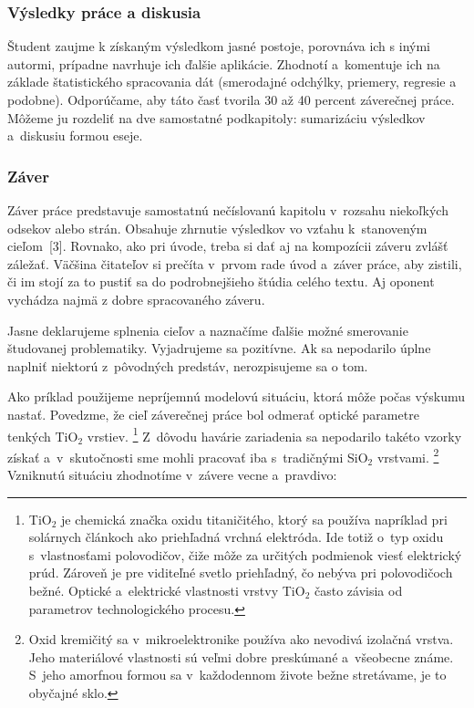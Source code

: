\subsubsection*{\normalsize Výsledky práce a diskusia}
Študent zaujme k získaným výsledkom jasné postoje,
porovnáva ich s inými autormi, prípadne navrhuje ich ďalšie aplikácie.
Zhodnotí a~komentuje ich na základe štatistického spracovania dát (smerodajné odchýlky, priemery, regresie a podobne).
Odporúčame, aby táto časť tvorila 30 až 40 percent záverečnej práce.
Môžeme ju rozdeliť na dve samostatné podkapitoly: sumarizáciu výsledkov a~diskusiu formou eseje.

\subsubsection{Záver}
Záver práce predstavuje samostatnú nečíslovanú kapitolu
v~rozsahu niekoľkých odsekov alebo strán.
Obsahuje zhrnutie výsledkov vo vzťahu k~stanoveným cieľom~[3].
Rovnako, ako pri úvode, treba si dať
aj na kompozícii záveru zvlášť záležať.
Väčšina čitateľov si prečíta v~prvom rade úvod a~záver práce,
aby zistili, či im stojí za to pustiť sa do podrobnejšieho
štúdia celého textu.
Aj oponent vychádza najmä z dobre spracovaného záveru.

Jasne deklarujeme splnenia cieľov a naznačíme ďalšie možné smerovanie študovanej problematiky. Vyjadrujeme sa pozitívne. Ak sa nepodarilo úplne naplniť niektorú z~pôvodných predstáv, nerozpisujeme sa o tom.

Ako príklad použijeme nepríjemnú modelovú situáciu,
ktorá môže počas výskumu nastať.
Povedzme, že cieľ záverečnej práce bol odmerať
optické parametre tenkých TiO$_2$ vrstiev.%
\footnote{TiO$_2$ je chemická značka oxidu titaničitého,
ktorý sa používa napríklad pri solárnych článkoch
ako priehľadná vrchná elektróda.
Ide totiž o~typ oxidu s~vlastnosťami polovodičov,
čiže môže za určitých podmienok viesť elektrický prúd.
Zároveň je pre viditeľné svetlo priehľadný,
čo nebýva pri polovodičoch bežné.
Optické a~elektrické vlastnosti vrstvy TiO$_2$
často závisia od parametrov technologického procesu.}
Z~dôvodu havárie zariadenia sa nepodarilo takéto vzorky získať
a~v~skutočnosti sme mohli pracovať iba
s~tradičnými SiO$_2$ vrstvami.%
\footnote{Oxid kremičitý sa v~mikroelektronike používa
ako nevodivá izolačná vrstva.
Jeho materiálové vlastnosti sú veľmi dobre preskúmané
a~všeobecne známe.
S~jeho amorfnou formou sa v~každodennom živote bežne stretávame,
je to obyčajné sklo.}
Vzniknutú situáciu zhodnotíme v~závere vecne a~pravdivo:


